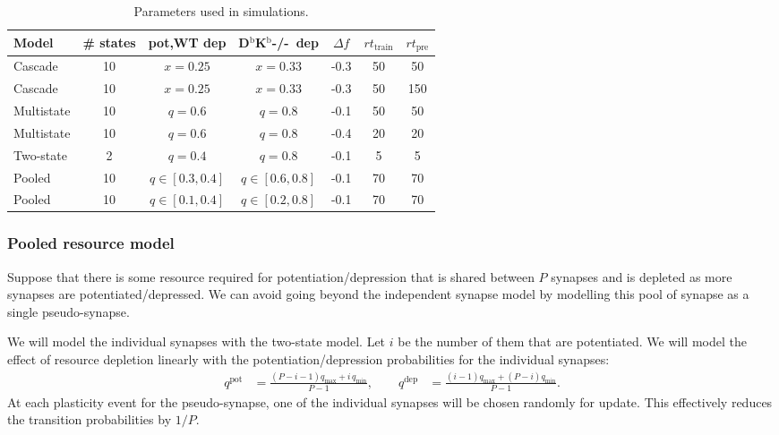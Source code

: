 \documentclass[12pt]{article}
\newcommand{\pot}{^{\text{pot}}}
\newcommand{\dep}{^{\text{dep}}}
\newcommand{\KO}{D$^\mathrm{b}$K$^\mathrm{b}$-/-}
\newcommand{\tpre}{t_{\text{pre}}}
\newcommand{\ttrain}{t_{\text{train}}}
\newcommand{\lmax}{_{\text{max}}}
\newcommand{\lmin}{_{\text{min}}}
\begin{document}
\begin{table}
 \begin{center}
  \begin{tabular}{|l|c|c|c|c|c|c|}
    \hline
    Model & \# states & pot,WT dep & \KO\ dep & $\Delta f$ & $r\ttrain$ & $r\tpre$ \\
    \hline
    Cascade    & 10 & $x=0.25$ & $x=0.33$ & -0.3 & 50 & 50  \\
    Cascade    & 10 & $x=0.25$ & $x=0.33$ & -0.3 & 50 & 150 \\
    Multistate & 10 & $q=0.6$  & $q=0.8$  & -0.1 & 50 & 50  \\
    Multistate & 10 & $q=0.6$  & $q=0.8$  & -0.4 & 20 & 20  \\
    Two-state  & 2  & $q=0.4$  & $q=0.8$  & -0.1 & 5  & 5   \\
    Pooled     & 10 & $q\in[0.3,0.4]$  & $q\in[0.6,0.8]$
                                          & -0.1 & 70 & 70 \\
    Pooled     & 10 & $q\in[0.1,0.4]$  & $q\in[0.2,0.8]$
                                          & -0.1 & 70 & 70 \\
    \hline
  \end{tabular}
 \end{center}
  \caption{Parameters used in simulations.} \label{tab:params}
\end{table}

\subsubsection{Pooled resource model}\label{sec:pooledmodel}

Suppose that there is some resource required for potentiation/depression that is shared between $P$ synapses and is depleted as more synapses are potentiated/depressed.
We can avoid going beyond the independent synapse model by modelling this pool of synapse as a single pseudo-synapse.

We will model the individual synapses with the two-state model.
Let $i$ be the number of them that are potentiated.
We will model the effect of resource depletion linearly with the potentiation/depression probabilities for the individual synapses:
%
\begin{equation}\label{eq:depletion}
  \begin{aligned}
    q\pot &= \frac{(P-i-1)q\lmax + i\,q\lmin}{P-1}, \qquad
    q\dep &= \frac{(i-1)q\lmax + (P-i)q\lmin}{P-1}.
  \end{aligned}
\end{equation}
%
At each plasticity event for the pseudo-synapse, one of the individual synapses will be chosen randomly for update.
This effectively reduces the transition probabilities by $1/P$.
\end{document}
